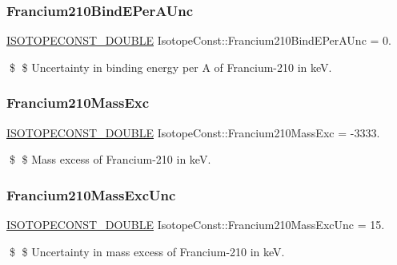 \subsubsection{\texorpdfstring{Francium210\+Bind\+E\+Per\+A\+Unc}{Francium210BindEPerAUnc}}
{\footnotesize\ttfamily \mbox{\hyperlink{group___isotope_const-_macros_ga8f45a7272ce02c0b4c65c44636ed719a}{I\+S\+O\+T\+O\+P\+E\+C\+O\+N\+S\+T\+\_\+\+D\+O\+U\+B\+LE}} Isotope\+Const\+::\+Francium210\+Bind\+E\+Per\+A\+Unc = 0.}

\$ \$ Uncertainty in binding energy per A of Francium-\/210 in keV. \mbox{\label{group___isotope_const-_francium-_fr210_ga7527634519496cd05a46c7e56aad77db}} 
\subsubsection{\texorpdfstring{Francium210\+Mass\+Exc}{Francium210MassExc}}
{\footnotesize\ttfamily \mbox{\hyperlink{group___isotope_const-_macros_ga8f45a7272ce02c0b4c65c44636ed719a}{I\+S\+O\+T\+O\+P\+E\+C\+O\+N\+S\+T\+\_\+\+D\+O\+U\+B\+LE}} Isotope\+Const\+::\+Francium210\+Mass\+Exc = -\/3333.}

\$ \$ Mass excess of Francium-\/210 in keV. \mbox{\label{group___isotope_const-_francium-_fr210_ga1e4386ed1c28b1938c2ea7ca3ae03fb5}} 
\subsubsection{\texorpdfstring{Francium210\+Mass\+Exc\+Unc}{Francium210MassExcUnc}}
{\footnotesize\ttfamily \mbox{\hyperlink{group___isotope_const-_macros_ga8f45a7272ce02c0b4c65c44636ed719a}{I\+S\+O\+T\+O\+P\+E\+C\+O\+N\+S\+T\+\_\+\+D\+O\+U\+B\+LE}} Isotope\+Const\+::\+Francium210\+Mass\+Exc\+Unc = 15.}

\$ \$ Uncertainty in mass excess of Francium-\/210 in keV. \mbox{\label{group___isotope_const-_francium-_fr210_ga685576ec6d016db9ffe28cdecdb7ac35}} 
